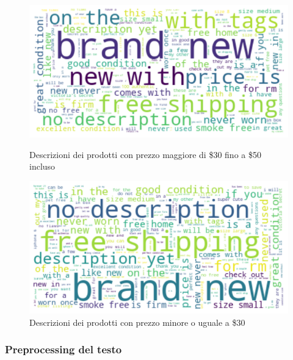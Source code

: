 \begin{figure}[H]
   \begin{minipage}{0.48\textwidth}
     \centering
     \includegraphics[width=.9\linewidth]{30_50}
	\caption{Descrizioni dei prodotti con prezzo maggiore di \$30 fino a \$50 incluso}
	\label{fig:30_50}   
	\end{minipage}\hfill
   \begin{minipage}{0.48\textwidth}
     \centering
     \includegraphics[width=.9\linewidth]{minore_30}
     \caption{Descrizioni dei prodotti con prezzo minore o uguale a \$30}
     \label{Fig:minore_30}
   \end{minipage}
\end{figure}

\subsubsection{Preprocessing del testo}

